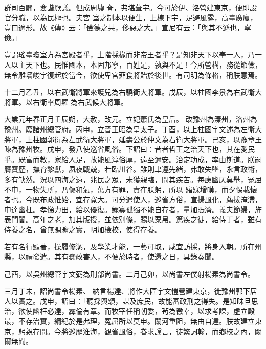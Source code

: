 \begin{pinyinscope}
 群司百闢，僉諧厥議。但成周墟脊，弗堪葺宇。今可於伊、洛營建東京，便即設官分職，以為民極也。夫宮
 室之制本以便生，上棟下宇，足避風露，高臺廣廈，豈曰適形。故《傳》云：「儉德之共，侈惡之大。」宣尼有云：「與其不遜也，寧儉。」



 豈謂瑤臺瓊室方為宮殿者乎，土階採椽而非帝王者乎？是知非天下以奉一人，乃一人以主天下也。民惟國本，本固邦寧，百姓足，孰與不足！今所營構，務從節儉，無令雕墻峻宇復起於當今，欲使卑宮菲食將貽於後世。有司明為條格，稱朕意焉。



 十二月乙丑，以右武衛將軍來護兒為右驍衛大將軍。戊辰，以柱國李景為右武衛大將軍。以右衛率周羅為右武候大將軍。



 大業元年春正月壬辰朔，大赦，改元。立妃蕭氏為皇后。
 改豫州為溱州，洛州為豫州。廢諸州總管府。丙申，立晉王昭為皇太子。丁酉，以上柱國宇文述為左衛大將軍，上柱國郭衍為左武衛大將軍，延壽公於仲文為右衛大將軍。己亥，以豫章王暕為豫州牧。戊申，發八使巡省風俗。下詔曰：昔者哲王之治天下也，其在愛民乎。既富而教，家給人足，故能風淳俗厚，遠至邇安。治定功成，率由斯道。朕嗣膺寶歷，撫育黎獻，夙夜戰兢，若臨川谷。雖則聿遵先緒，弗敢失墜，永言政術，多有缺然。況以四海之遠，兆民之眾，未獲親臨，問其疾苦。每慮幽仄莫舉，冤屈不申，一物失所，乃傷和氣，萬方有罪，責在朕躬，所以
 寤寐增嘆，而夕惕載懷者也。今既布政惟始，宜存寬大。可分遣使人，巡省方俗，宣揚風化，薦拔淹滯，申達幽枉。孝悌力田，給以優復。鰥寡孤獨不能自存者，量加賑濟。義夫節婦，旌表門閭。高年之老，加其版授，並依別條，賜以粟帛。篤疾之徒，給侍丁者，雖有侍養之名，曾無賙贍之實，明加檢校，使得存養。



 若有名行顯著，操履修潔，及學業才能，一藝可取，咸宜訪採，將身入朝。所在州縣，以禮發遣。其有蠢政害人，不便於時者，使還之日，具錄奏聞。



 己酉，以吳州總管宇文弼為刑部尚書。二月己卯，以尚書左僕射楊素為尚書令。



 三月丁未，詔尚書令楊素、
 納言楊達、將作大匠宇文愷營建東京，徙豫州郭下居人以實之。戊申，詔曰：「聽採輿頌，謀及庶民，故能審政刑之得失。是知昧旦思治，欲使幽枉必達，彞倫有章。而牧宰任稱朝委，茍為徼幸，以求考課，虛立殿最，不存治實，綱紀於是弗理，冤屈所以莫申。關河重阻，無由自達。朕故建立東京，躬親存問。今將巡歷淮海，觀省風俗，眷求讜言，徒繁詞翰，而鄉校之內，闕爾無聞。




\end{pinyinscope}
